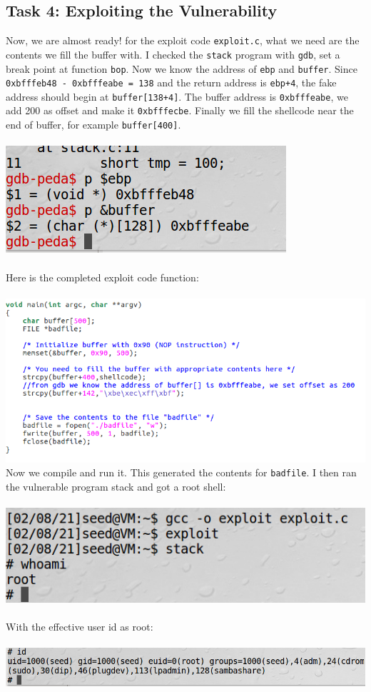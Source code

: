 \documentclass[a4paper]{article}
\begin{document}
\subsection{Task 4: Exploiting the Vulnerability}
Now, we are almost ready! for the exploit code \verb+exploit.c+, what we need are the contents we fill the buffer with. I checked the \verb+stack+ program with \verb+gdb+, set a break point at function \verb+bop+. Now we know the address of \verb+ebp+ and \verb+buffer+. Since \verb+0xbfffeb48 - 0xbfffeabe = 138+ and the return address is \verb-ebp+4-, the fake address should begin at \verb-buffer[138+4]-. The buffer address is \verb+0xbfffeabe+, we add 200 as offset and make it \verb+0xbfffecbe+. Finally we fill the shellcode near the end of buffer, for example \verb+buffer[400]+.\\\\
\includegraphics[scale=0.7]{2/4.png}\\\\
Here is the completed exploit code function:\\\\
\pagebreak
\includegraphics[scale=0.7]{2/5.png}\\
Now we compile and run it. This generated the contents for \verb+badfile+. I then ran the vulnerable program stack and got a root shell:\\\\
\includegraphics[scale=0.7]{2/6.png}\\\\
With the effective user id as root:\\\\
\includegraphics[scale=0.7]{2/7.png}\\
\end{document}
